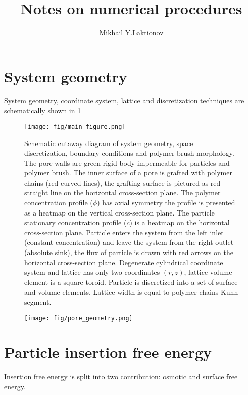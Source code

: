 \documentclass[12pt, a4paper]{article}
\begin{document}
\title{Notes on numerical procedures}
\author{Mikhail Y.Laktionov}
\maketitle

\section{System geometry}

System geometry, coordinate system, lattice and discretization techniques are schematically shown in \ref{fig:main} 

\begin{figure}    
    \texttt{[image: fig/main\_figure.png]}
    \caption{Schematic cutaway diagram of system geometry, space discretization, boundary conditions and polymer brush morphology. 
    The pore walls are green rigid body impermeable for particles and polymer brush. The inner surface of a pore is grafted with polymer chains (red curved lines), the grafting surface is pictured as red straight line on the horizontal cross-section plane. 
    The polymer concentration profile ($\phi$) has axial symmetry the profile is presented as a heatmap on the vertical cross-section plane. 
    The particle stationary concentration profile ($c$) is a heatmap on the horizontal cross-section plane. 
    Particle enters the system from the left inlet (constant concentration) and leave the system from the right outlet (absolute sink), the flux of particle is drawn with red arrows on the horizontal cross-section plane.
    Degenerate cylindrical coordinate system and lattice has only two coordinates $(r, z)$, lattice volume element is a square toroid. Particle is discretized into a set of surface and volume elements.
    Lattice width is equal to polymer chains Kuhn segment.}
    \label{fig:main}
\end{figure}

\begin{figure}
    \texttt{[image: fig/pore\_geometry.png]}
\end{figure}

\section{Particle insertion free energy}

Insertion free energy is split into two contribution: osmotic and surface free energy.
\end{document}
